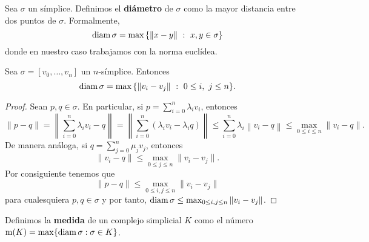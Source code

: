 \begin{definicion}
	Sea $\sigma$ un símplice. Definimos el \textbf{diámetro} de $\sigma$ como la mayor distancia entre dos puntos de $\sigma$. Formalmente,
	\[
		\diam \sigma = \max{\{\|x-y\|\ :\ x,y \in \sigma\}}
	\]
	donde en nuestro caso trabajamos con la norma euclídea.
\end{definicion}
\begin{lema}
	\label{lem:char-diam}
	Sea $\sigma = [v_0, \dots, v_n]$ un $n$-símplice. Entonces
	\[
		\diam \sigma = \max{\{\|v_i-v_j\|\ :\ 0 \leq i,\ j \leq n\}}.
	\]
\end{lema}
\begin{proof}
	Sean $p,q \in \sigma$. En particular, si $p = \sum_{i=0}^{n} \lambda_i v_i$, entonces
	\[
		\|p-q\|=\left\|\sum_{i=0}^{n} \lambda _ {i} v_{i} - q\right\|=\left\| \sum _{i=0}^{n}(\lambda _{i} v_{i} - \lambda_{i} q)\right\| \leq \sum_{i=0}^{n} \lambda_{i} \left\|v_{i}-q\right\| \leq \max_{0 \leq i \leq n} \|v_{i} - q\|.
	\]
	De manera análoga, si $q = \sum_{j=0}^{n} \mu_j v_j$, entonces
	\[
		\|v_i - q\| \leq \max_{0 \leq j \leq n} \|v_i -v_j\|.
	\]
	Por consiguiente tenemos que \[\|p-q\| \leq \max_{0\leq i, j\leq n}\|v_i-v_j\|\] para cualesquiera $p,q \in \sigma$ y por tanto, $\operatorname{diam} \sigma \leq \max_{0\leq i, j\leq n}\|v_i-v_j\|$.
\end{proof}

\begin{definicion}
	Definimos la \textbf{medida} de un complejo simplicial $K$ como el número $\operatorname{m} (K) = \max \{\operatorname{diam} \sigma : \sigma \in K\}$.
\end{definicion}

